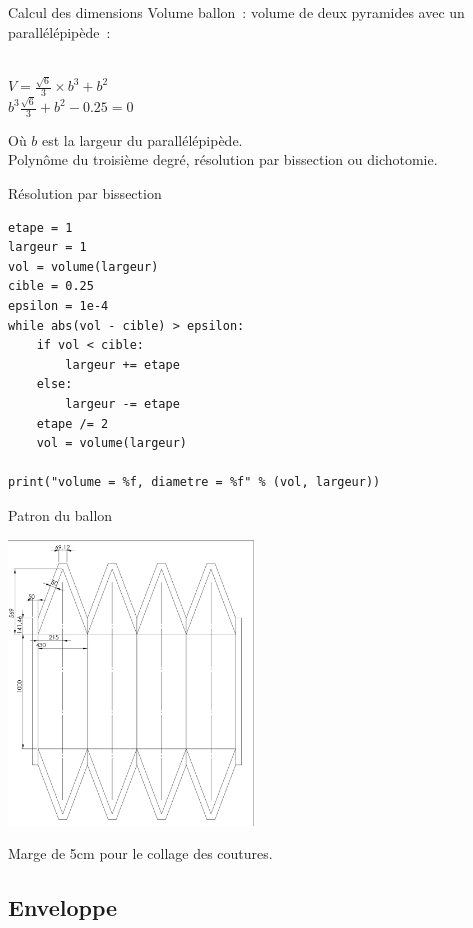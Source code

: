 \begin{frame}{Calcul des dimensions}
  Volume ballon~: volume de deux pyramides avec un parallélépipède~:
  \begin{center}
	 \\
	$\displaystyle{V = \frac{\sqrt{6}}{3} \times b^3 + b^2 }$ \\
	$\displaystyle{b^3 \frac{\sqrt{6}}{3} + b^2 - 0.25 = 0}$
  \end{center}
  Où $b$ est la largeur du parallélépipède. \\
  Polynôme du troisième degré, résolution par bissection ou dichotomie.
\end{frame}

\begin{frame}[fragile]{Résolution par bissection}
  \begin{lstlisting}[frame=single]
etape = 1
largeur = 1
vol = volume(largeur)
cible = 0.25
epsilon = 1e-4
while abs(vol - cible) > epsilon:
	if vol < cible:
		largeur += etape
	else:
		largeur -= etape
	etape /= 2
	vol = volume(largeur)

print("volume = %f, diametre = %f" % (vol, largeur))
  \end{lstlisting}
\end{frame}

\begin{frame}{Patron du ballon}
  \begin{center}
    \includegraphics[width=6.5cm, angle=270]{../Images/plan_ballon.png}
  \end{center}
  Marge de 5cm pour le collage des coutures.
\end{frame}

\subsection{Enveloppe}

